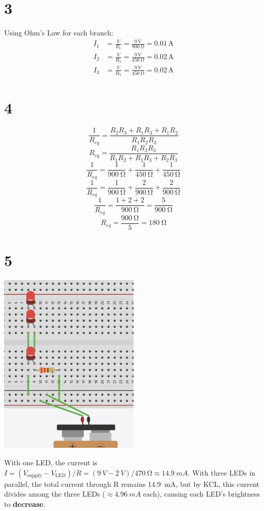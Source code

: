 \documentclass[10pt]{article}
\begin{document}
\section*{3}

Using Ohm's Law for each branch:
\begin{align*} I_1 &= \frac{V}{R_1} = \frac{9 \, \text{V}}{900 \, \Omega} = 0.01 \, \text{A} \\ I_2 &= \frac{V}{R_2} = \frac{9 \, \text{V}}{450 \, \Omega} = 0.02 \, \text{A} \\ I_3 &= \frac{V}{R_3} = \frac{9 \, \text{V}}{450 \, \Omega} = 0.02 \, \text{A} \end{align*}

\section*{4}
\[
	\frac{1}{R_{eq}} = \frac{R_2 R_3 + R_1 R_3 + R_1 R_2}{R_1 R_2 R_3}
\]
\[
	R_{eq} = \frac{R_1 R_2 R_3}{R_1 R_2 + R_1 R_3 + R_2 R_3}
\]
\[
	\frac{1}{R_{eq}} = \frac{1}{\SI{900}{\ohm}} + \frac{1}{\SI{450}{\ohm}} + \frac{1}{\SI{450}{\ohm}}
\]
\[
	\frac{1}{R_{eq}} = \frac{1}{\SI{900}{\ohm}} + \frac{2}{\SI{900}{\ohm}} + \frac{2}{\SI{900}{\ohm}}
\]
\[
	\frac{1}{R_{eq}} = \frac{1+2+2}{\SI{900}{\ohm}} = \frac{5}{\SI{900}{\ohm}}
\]
\[
	R_{eq} = \frac{\SI{900}{\ohm}}{5} = \SI{180}{\ohm}
\]

\section*{5}

\begin{center}
	\includegraphics[width=0.5\textwidth]{led3.png}
\end{center}

With one LED, the current is \( I = (V_{\text{supply}} - V_{\text{LED}}) / R = (\SI{9}{V} - \SI{2}{V}) / \SI{470}{\ohm} \approx \SI{14.9}{mA} \). With three LEDs in parallel, the total current through R remains \SI{14.9}{mA}, but by KCL, this current divides among the three LEDs (\(\approx \SI{4.96}{mA}\) each), causing each LED's brightness to \textbf{decrease}.
\end{document}
